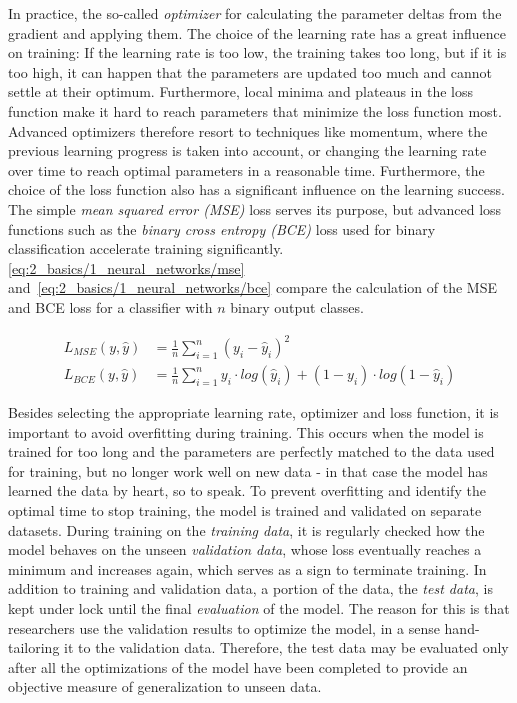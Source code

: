 In practice, the so-called \emph{optimizer} for calculating the parameter deltas from the gradient and applying them. The choice of the learning rate has a great influence on training: If the learning rate is too low, the training takes too long, but if it is too high, it can happen that the parameters are updated too much and cannot settle at their optimum. Furthermore, local minima and plateaus in the loss function make it hard to reach parameters that minimize the loss function most. Advanced optimizers therefore resort to techniques like momentum, where the previous learning progress is taken into account, or changing the learning rate over time to reach optimal parameters in a reasonable time. Furthermore, the choice of the loss function also has a significant influence on the learning success. The simple \emph{mean squared error (MSE)} loss serves its purpose, but advanced loss functions such as the \emph{binary cross entropy (BCE)} loss used for binary classification accelerate training significantly. \autoref{eq:2_basics/1_neural_networks/mse} and~\ref{eq:2_basics/1_neural_networks/bce} compare the calculation of the MSE and BCE loss for a classifier with $n$ binary output classes.

\begin{align}
    L_{MSE}(y, \hat{y}) &= \frac{1}{n} \sum_{i=1}^n (y_i - \hat{y}_i)^2
    \label{eq:2_basics/1_neural_networks/mse} \\
    L_{BCE}(y, \hat{y}) &= \frac{1}{n} \sum_{i=1}^n y_i \cdot log( \hat{y}_i) + (1-y_i) \cdot log(1 - \hat{y}_i)
    \label{eq:2_basics/1_neural_networks/bce}
\end{align}

Besides selecting the appropriate learning rate, optimizer and loss function, it is important to avoid overfitting during training. This occurs when the model is trained for too long and the parameters are perfectly matched to the data used for training, but no longer work well on new data - in that case the model has learned the data by heart, so to speak. To prevent overfitting and identify the optimal time to stop training, the model is trained and validated on separate datasets. During training on the \emph{training data}, it is regularly checked how the model behaves on the unseen \emph{validation data}, whose loss eventually reaches a minimum and increases again, which serves as a sign to terminate training. In addition to training and validation data, a portion of the data, the \emph{test data}, is kept under lock until the final \emph{evaluation} of the model. The reason for this is that researchers use the validation results to optimize the model, in a sense hand-tailoring it to the validation data. Therefore, the test data may be evaluated only after all the optimizations of the model have been completed to provide an objective measure of generalization to unseen data.

